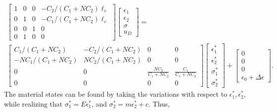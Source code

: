 \documentclass[10pt]{elsarticle}
\begin{document}
\begin{multline}
	\begin{bmatrix}
		1 & 0& 0&  -C_2/(C_1+NC_2) \ell_e \\
		0 & 1 & 0 & -C_1/(C_1+NC_2) \ell_e \\
		0 & 0 & 1 & 0 \\
		0 & 1 & 0 & 0
	\end{bmatrix}
	\begin{bmatrix}
		\epsilon_1 \\
		\epsilon_2 \\
		\sigma \\
		u_D
	\end{bmatrix}
	= \\
	\begin{bmatrix}
		C_1/(C_1+NC_2) & -C_2/(C_1+NC_2) & 0 & 0 \\
		-NC_1/(C_1+NC_2) & NC_2/(C_1+NC_2) & 0 & 0 \\
		0 & 0 & \frac{NC_2}{C_1+N C_2} & \frac{C_1}{C_1+N C_2} \\ 
		0 & 0 & 0&0
	\end{bmatrix}
	\begin{bmatrix}
		\epsilon_1^* \\
		\epsilon_2^* \\
		\sigma_1^* \\
		\sigma_2^* 
	\end{bmatrix}
	+
	\begin{bmatrix}
		0 \\
		0  \\
		0	\\
		\epsilon_0 + \Delta \epsilon
	\end{bmatrix}
	.
\end{multline}
The material states can be found by taking the variations with respect to $\epsilon_1^*, \epsilon_2^*$, while realizing that $\sigma_1^*=E\epsilon_1^*$, and $\sigma_2^*=m\epsilon_2^*+c$. Thus,
\end{document}
